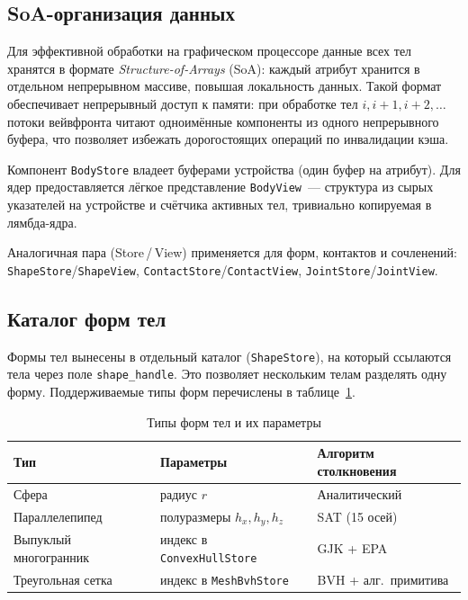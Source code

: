 \subsection{SoA-организация данных}

Для эффективной обработки на графическом процессоре данные всех тел хранятся в формате 
\textit{Structure-of-Arrays} (SoA): каждый атрибут хранится в отдельном непрерывном массиве, повышая 
локальность данных. Такой формат обеспечивает непрерывный доступ к памяти: при обработке тел $i, i{+}1, i{+}2, 
\ldots$ потоки вейвфронта читают одноимённые компоненты из одного непрерывного буфера, что позволяет избежать 
дорогостоящих операций по инвалидации кэша.

Компонент \texttt{BodyStore} владеет буферами устройства (один буфер на атрибут). Для ядер предоставляется 
лёгкое представление \texttt{BodyView}~--- структура из сырых указателей на устройстве и счётчика активных 
тел, тривиально копируемая в лямбда-ядра.

Аналогичная пара (Store\,/\,View) применяется для форм, контактов и сочленений: 
\texttt{ShapeStore}/\allowbreak\texttt{ShapeView}, \texttt{ContactStore}/\allowbreak\texttt{ContactView}, 
\texttt{JointStore}/\allowbreak\texttt{JointView}.

\subsection{Каталог форм тел}

Формы тел вынесены в отдельный каталог (\texttt{ShapeStore}), на который ссылаются тела через поле 
\texttt{shape\_handle}. Это позволяет нескольким телам разделять одну форму. Поддерживаемые типы форм 
перечислены в таблице~\ref{tab:shape_types}.

\begin{table}[h]
\centering
\caption{Типы форм тел и их параметры}
\label{tab:shape_types}
\begin{tabular}{lll}
\toprule
\textbf{Тип} & \textbf{Параметры} & \textbf{Алгоритм столкновения} \\
\midrule
Сфера         & радиус $r$               & Аналитический \\
Параллелепипед & полуразмеры $h_x, h_y, h_z$ & SAT (15 осей) \\
Выпуклый многогранник & индекс в \texttt{ConvexHullStore}  & GJK + EPA \\
Треугольная сетка  & индекс в \texttt{MeshBvhStore}      & BVH + алг.\ примитива \\
\bottomrule
\end{tabular}
\end{table}

